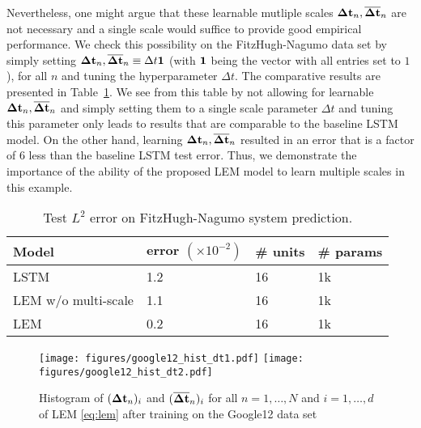 \documentclass{article} \usepackage{iclr2022_conference,times}
\newcommand{\Dt}{{\Delta t}}
\newcommand{\Tref}[1]{Table~\ref{#1}}
\begin{document}
Nevertheless, one might argue that these learnable mutliple scales ${\bf \Dt}_n,\overline{\bf \Dt}_n$ are not necessary and a single scale would suffice to provide good empirical performance. We check this possibility on the FitzHugh-Nagumo data set by simply setting ${\bf \Dt}_n,\overline{\bf \Dt}_n \equiv \Dt {\bf 1}$ (with $\bf 1$ being the vector with all entries set to $1$), for all $n$ and tuning the hyperparameter $\Dt$. The comparative results are presented in \Tref{tab:FHN_wo_ms}. We see from this table by not allowing for learnable ${\bf \Dt}_n,\overline{\bf \Dt}_n$ and simply setting them to a single scale parameter $\Dt$ and tuning this parameter only leads to results that are comparable to the baseline LSTM model. On the other hand, learning ${\bf \Dt}_n,\overline{\bf \Dt}_n$ resulted in an error that is a factor of $6$ less than the baseline LSTM test error. Thus, we demonstrate the importance of the ability of the proposed LEM model to learn multiple scales in this example.  
\begin{table}[h!]
\caption{Test $L^2$ error on FitzHugh-Nagumo system prediction.}
\label{tab:FHN_wo_ms}
\centering
\begin{tabular}{llll}
\toprule
\cmidrule(r){1-4}
Model &  error $(\times10^{-2})$ & \# units & \# params \\
\midrule
LSTM & 1.2 & 16 & 1k  \\
LEM w/o multi-scale & 1.1 & 16 & 1k \\
LEM & 0.2 & 16 & 1k  \\
    \bottomrule
  \end{tabular}
\end{table}

\begin{figure}[ht!]
\centering
\texttt{[image: figures/google12\_hist\_dt1.pdf]}
\texttt{[image: figures/google12\_hist\_dt2.pdf]}
\caption{Histogram of $({\bf \Dt}_n)_i$ and $({\bf \overline{\Dt}}_n)_i$ for all $n=1,\dots,N$ and $i=1,\dots,d$ of LEM \eqref{eq:lem} after training on the Google12 data set}
\label{fig:g12_hist}
\end{figure}
\end{document}
